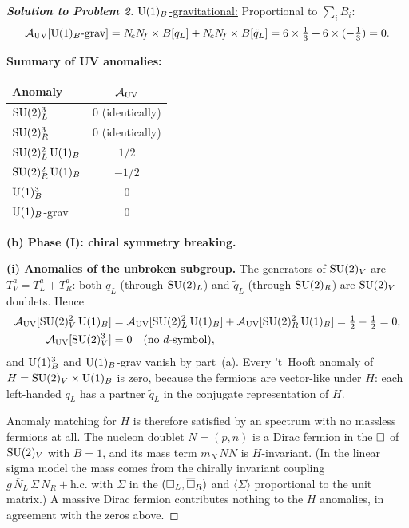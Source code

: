 \documentclass[11pt,a4paper]{article}
\begin{document}
\begin{proof}[\textbf{Solution to Problem 2}]
\underline{$\mathrm{U}(1)_B$-gravitational:} Proportional to $\sum_i B_i$:
\begin{equation}
  \mathcal{A}_{\mathrm{UV}}[\mathrm{U}(1)_B\text{-grav}]
  = N_{\!c}N_{\!f} \times B[q_L] + N_{\!c}N_{\!f} \times B[\tilde{q}_L]
  = 6 \times \tfrac{1}{3} + 6 \times (-\tfrac{1}{3})
  = 0.
\end{equation}

\textbf{Summary of UV anomalies:}

\begin{center}
\renewcommand{\arraystretch}{1.3}
\begin{tabular}{@{}l c@{}}
\toprule
\textbf{Anomaly} & $\mathcal{A}_{\mathrm{UV}}$ \\
\midrule
$\mathrm{SU}(2)_L^3$ & $0$ (identically) \\
$\mathrm{SU}(2)_R^3$ & $0$ (identically) \\
$\mathrm{SU}(2)_L^2\,\mathrm{U}(1)_B$ & $1/2$ \\
$\mathrm{SU}(2)_R^2\,\mathrm{U}(1)_B$ & $-1/2$ \\
$\mathrm{U}(1)_B^3$ & $0$ \\
$\mathrm{U}(1)_B$-grav & $0$ \\
\bottomrule
\end{tabular}
\end{center}

\textbf{(b) Phase (I): chiral symmetry breaking.}

\textbf{(i) Anomalies of the unbroken subgroup.}  The generators of
$\mathrm{SU}(2)_V$ are $T^a_V = T^a_L + T^a_R$: both $q_L$ (through $\mathrm{SU}(2)_L$)
and $\tilde{q}_L$ (through $\mathrm{SU}(2)_R$) are $\mathrm{SU}(2)_V$ doublets.  Hence
\begin{align}
  \mathcal{A}_{\mathrm{UV}}[\mathrm{SU}(2)_V^2\,\mathrm{U}(1)_B]
  &= \mathcal{A}_{\mathrm{UV}}[\mathrm{SU}(2)_L^2\,\mathrm{U}(1)_B]
   + \mathcal{A}_{\mathrm{UV}}[\mathrm{SU}(2)_R^2\,\mathrm{U}(1)_B]
   = \tfrac{1}{2} - \tfrac{1}{2} = 0, \\
  \mathcal{A}_{\mathrm{UV}}[\mathrm{SU}(2)_V^3] &= 0 \quad (\text{no $d$-symbol}),
\end{align}
and $\mathrm{U}(1)_B^3$ and $\mathrm{U}(1)_B$-grav vanish by part~(a).  Every
't~Hooft anomaly of $H = \mathrm{SU}(2)_V \times \mathrm{U}(1)_B$ is zero, because the
\UV{} fermions are vector-like under $H$: each left-handed $q_L$ has a
partner $\tilde{q}_L$ in the conjugate representation of $H$.

Anomaly matching for $H$ is therefore satisfied by an \IR{} spectrum
with no massless fermions at all.  The nucleon doublet $N = (p, n)$ is a
Dirac fermion in the $\square$ of $\mathrm{SU}(2)_V$ with $B = 1$, and its mass
term $m_N\,\overline{N}N$ is $H$-invariant.  (In the linear sigma model
the mass comes from the chirally invariant coupling
$g\,\overline{N}_L\,\Sigma\,N_R + \text{h.c.}$ with $\Sigma$ in the
$(\square_L, \overline{\square}_R)$ and $\langle\Sigma\rangle$ proportional to the unit
matrix.)
A massive Dirac fermion contributes nothing to the $H$ anomalies, in
agreement with the zeros above.


\end{proof}
\end{document}
